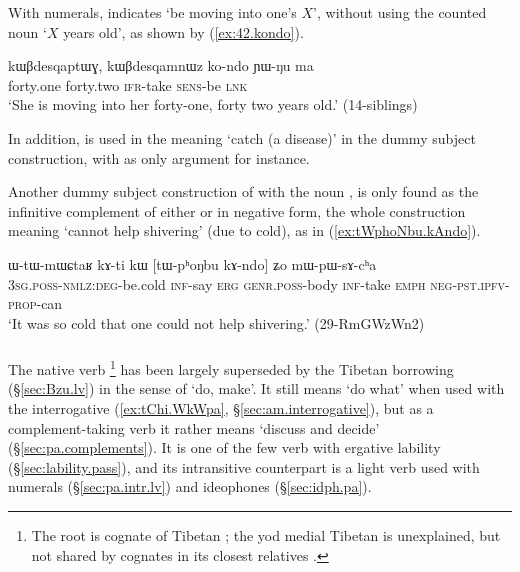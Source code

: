 With numerals,  indicates `be moving into one's $X$', without using the counted noun  `$X$ years old', as shown by (\ref{ex:42.kondo}).

\begin{exe}
\ex \label{ex:42.kondo}
\gll  kɯβdesqaptɯɣ, kɯβdesqamnɯz ko-ndo ɲɯ-ŋu ma \\
forty.one forty.two \textsc{ifr}-take \textsc{sens}-be \textsc{lnk} \\ 
\glt `She is moving into her forty-one, forty two years old.' (14-siblings)
 \end{exe}
  
In addition,  is used in the meaning `catch (a disease)' in the dummy subject construction, with  as only argument for instance.
 
Another dummy subject construction of  with  the noun ,  is only found as the infinitive complement of either  or   in negative form, the whole construction meaning `cannot help shivering' (due to cold), as in (\ref{ex:tWphoNbu.kAndo}). 

\begin{exe}
\ex \label{ex:tWphoNbu.kAndo}
\gll  ɯ-tɯ-mɯɕtaʁ kɤ-ti kɯ [tɯ-pʰoŋbu kɤ-ndo] ʑo mɯ-pɯ-sɤ-cʰa \\
\textsc{3sg}.\textsc{poss}-\textsc{nmlz}:\textsc{deg}-be.cold \textsc{inf}-say \textsc{erg} \textsc{genr}.\textsc{poss}-body \textsc{inf}-take \textsc{emph} \textsc{neg}-\textsc{pst}.\textsc{ipfv}-\textsc{prop}-can \\
\glt `It was so cold that one could not help shivering.' (29-RmGWzWn2)
\end{exe} 

 \subsubsection{ } \label{sec:pa.lv}
The native verb \footnote{The root  is cognate of Tibetan ; the yod medial Tibetan is unexplained, but not shared by cognates in its closest relatives \citep{jacques13yod}. } has been largely superseded by the Tibetan borrowing  (§\ref{sec:Bzu.lv}) in the sense of `do, make'. It still means `do what' when used with the interrogative  (\ref{ex:tChi.WkWpa}, §\ref{sec:am.interrogative}), but as a com\-ple\-ment-taking verb it rather means `discuss and decide' (§\ref{sec:pa.complements}). It is one of the few verb with ergative lability (§\ref{sec:lability.pass}), and its intransitive counterpart is a light verb used with numerals (§\ref{sec:pa.intr.lv}) and ideophones (§\ref{sec:idph.pa}).


